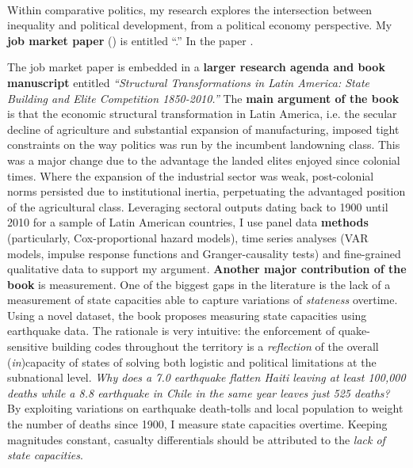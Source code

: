\documentclass[10pt,stdletter,dateno,sigleft]{newlfm} %
\begin{document}
\begin{newlfm}




\vspace{-2cm}{\bf \huge Research Statement}\\

Within comparative politics, my research explores the intersection between inequality and political development, from a political economy perspective. My {\bf job market paper} (\emph{\unskip}) is entitled ``\href{https://github.com/hbahamonde/Earthquake_Paper/raw/master/Bahamonde_Earthquake_Paper.pdf}{\unskip}.'' In the paper \unskip.



The job market paper is embedded in a {\bf larger research agenda and book manuscript} entitled \emph{``Structural Transformations in Latin America: State Building and Elite Competition 1850-2010.''} The {\bf main argument of the book} is that the economic structural transformation in Latin America, i.e. the secular decline of agriculture and substantial expansion of manufacturing, imposed tight constraints on the way politics was run by the incumbent landowning class. This was a major change due to the advantage the landed elites enjoyed since colonial times. Where the expansion of the industrial sector was weak, post-colonial norms persisted due to institutional inertia, perpetuating the advantaged position of the agricultural class. Leveraging sectoral outputs dating back to 1900 until 2010 for a sample of Latin American countries, I use panel data {\bf methods} (particularly, Cox-proportional hazard models), time series analyses (VAR models, impulse response functions and Granger-causality tests) and fine-grained qualitative data to support my argument. {\bf Another major contribution of the book} is measurement. One of the biggest gaps in the literature is the lack of a measurement of state capacities able to capture variations of \emph{stateness} overtime. Using a novel dataset, the book proposes measuring state capacities using earthquake data. The rationale is very intuitive: the enforcement of quake-sensitive building codes throughout the territory is a \emph{reflection} of the overall (\emph{in})capacity of states of solving both logistic and political limitations at the subnational level. \emph{Why does a 7.0 earthquake flatten Haiti leaving at least 100,000 deaths while a 8.8 earthquake in Chile in the same year leaves just 525 deaths?} By exploiting  variations on earthquake death-tolls and local population to weight the number of deaths since 1900, I measure state capacities overtime. Keeping magnitudes constant, casualty differentials should be attributed to the \emph{lack of state capacities}.



\end{newlfm}
\end{document}

